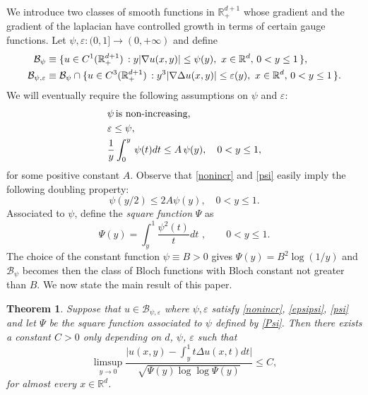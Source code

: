\documentclass[11pt,letterpaper]{amsart}
\newtheorem{theorem}{Theorem}[section]
\theoremstyle{definition}
\numberwithin{equation}{section}
\newcommand{\R}{\mathbb R}
\begin{document}
\medskip

We introduce two classes of smooth functions in $\R^{d+1}_{+}$ whose gradient and the gradient of the laplacian have controlled growth in terms of certain gauge functions. Let  $\psi  , \varepsilon  : (0,1] \to (0, +\infty )$ and define
\begin{align*}
\mathcal{B}_{\psi}  & \equiv   \{ u \in C^1 (\R^{d+1}_{+}) \, :   y|\nabla u (x,y)|  \leq \psi (y),   \, \, x \in \R^d , \, 0 <y\leq 1 \,  \},  \vspace{0.12cm} \\
\mathcal{B}_{\psi , \varepsilon } &  \equiv   \mathcal{B}_{\psi} \cap  \{ u \in C^3 (\R^{d+1}_{+}) \, : y^3 |\nabla \Delta u(x,y)| \leq \varepsilon (y),  \, \, x \in \R^d , \, 0 <y\leq 1 \, \} .  \vspace{0.12cm} 
\end{align*}
We will eventually require the following assumptions on $\psi$ and $\varepsilon$:
\begin{eqnarray}
& \psi \, \text{is non-increasing, }   \label{nonincr} \vspace{0.12cm}\\
& \varepsilon \leq \psi , \label{epsipsi}\vspace{0.12cm}\\
& \displaystyle \frac{1}{y}\int_{0}^y \, \psi (t) dt  \leq   A \, \psi (y), \quad 0<y\leq 1 ,  \label{psi} \vspace{0.12cm}
\end{eqnarray}
\noindent for some positive constant $A $. Observe that \eqref{nonincr} and \eqref{psi} easily imply the following doubling property:
\begin{equation}\label{doubling}
\psi (y/2)  \leq 2A \psi (y), \quad 0<y \leq 1 .
\end{equation}
Associated to $\psi$,  define the \textit{square function} $\Psi$ as
\begin{equation}\label{Psi}
\Psi (y) = \int_y^1  \frac{\psi^2 (t)}{t} dt \, \, , \qquad 0 < y \leq 1 .
\end{equation}
The choice of the constant function $\psi  \equiv  B>0$ gives $\Psi (y) = B^2 \log (1/y)$ and $\mathcal{B}_\psi$ becomes then the class of Bloch functions with Bloch constant not greater than $B$. We now state the main result of this paper.

\begin{theorem}\label{maintheorem}
Suppose that $u \in \mathcal{B}_{\psi , \varepsilon }$ where $\psi , \varepsilon $ satisfy \eqref{nonincr}, \eqref{epsipsi}, \eqref{psi} and let $\Psi$ be the square function associated to $\psi$ defined by \eqref{Psi}. Then there exists a constant $C>0$ only depending on $d$, $\psi$, $\varepsilon$ such that 
\begin{equation}\label{mainlil}
\limsup_{y\to 0} \frac{ \displaystyle \Big|u(x,y) - \int_{y}^1 t \Delta u(x,t) dt \Big| }{\sqrt{\Psi (y) \log \log \Psi (y)} } \leq C, 
\end{equation}
for almost every $x\in \R^d$.
\end{theorem}
\end{document}
